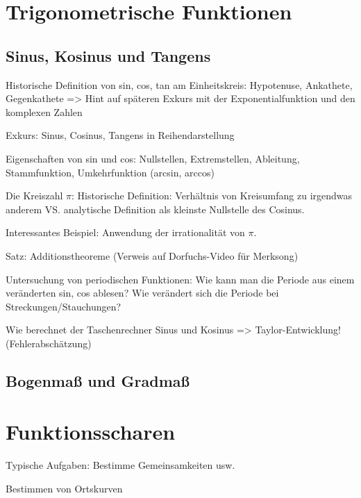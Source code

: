 \section{Trigonometrische Funktionen}

\subsection{Sinus, Kosinus und Tangens}
Historische Definition von sin, cos, tan am Einheitskreis: Hypotenuse, Ankathete, Gegenkathete => Hint auf späteren Exkurs mit der Exponentialfunktion und den komplexen Zahlen

\begin{definition}
    
\end{definition}

Exkurs: Sinus, Cosinus, Tangens in Reihendarstellung

\begin{definition}
    
\end{definition}

Eigenschaften von sin und cos: Nullstellen, Extremstellen, Ableitung, Stammfunktion, Umkehrfunktion (arcsin, arccos)

Die Kreiszahl \(\pi\): Historische Definition: Verhältnis von Kreisumfang zu irgendwas anderem VS. analytische Definition als kleinste Nullstelle des Cosinus. 

Interessantes Beispiel: Anwendung der irrationalität von \(\pi\). 

Satz: Additionstheoreme (Verweis auf Dorfuchs-Video für Merksong)
\begin{theorem}[Additionstheoreme]
    
\end{theorem}

\begin{corollary}[Doppelwinkelformeln]
    
\end{corollary}

Untersuchung von periodischen Funktionen: Wie kann man die Periode aus einem veränderten sin, cos ablesen? Wie verändert sich die Periode bei Streckungen/Stauchungen?

Wie berechnet der Taschenrechner Sinus und Kosinus => Taylor-Entwicklung! (Fehlerabschätzung)

\subsection{Bogenmaß und Gradmaß}


\section{Funktionsscharen}
Typische Aufgaben: Bestimme Gemeinsamkeiten usw. 

Bestimmen von Ortskurven